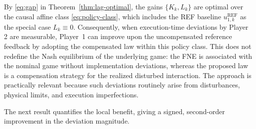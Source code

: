 \documentclass[letterpaper, 10 pt, conference]{ieeeconf}  %
\begin{document}
By \eqref{eq:gap} in Theorem~\ref{thm:lag-optimal}, the gains $\{K_k, L_k\}$ are optimal over the causal affine class \eqref{eq:policy-class}, which includes the REF baseline $u_{1,k}^{\text{REF}}$ as the special case $L_k\equiv0$. 
Consequently, when execution-time deviations by Player 2 are measurable, Player~1 can improve upon the uncompensated reference feedback by adopting the compensated law within this policy class. This does not redefine the Nash equilibrium of the underlying game: the FNE is associated with the nominal game without implementation deviations, whereas the proposed law is a compensation strategy for the realized disturbed interaction.
The approach is practically relevant because such deviations routinely arise from disturbances, physical limits, and execution imperfections.

The next result quantifies the local benefit, giving a signed, second-order improvement in the deviation magnitude.
\end{document}
